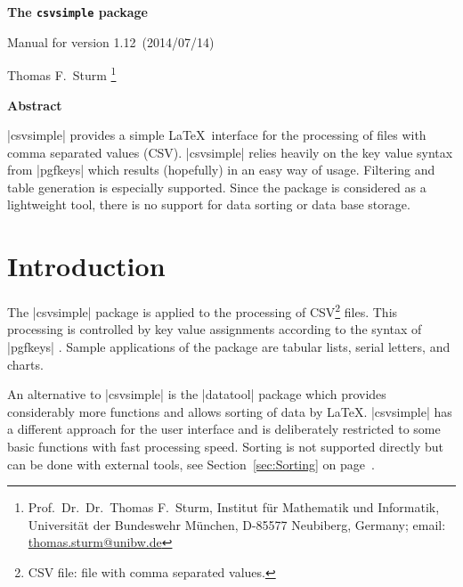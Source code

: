 \documentclass[a4paper,11pt]{ltxdoc}
\def\version{1.12}%
\def\datum{2014/07/14}%
\begin{document}
\begin{center}
\vspace*{5mm}
\begin{tcolorbox}[enhanced,
  center upper,width=10cm,boxrule=0.4pt,
  colback=white,colframe=black!50!yellow,drop fuzzy midday shadow=black!50!yellow]
{\bfseries\LARGE The \texttt{csvsimple} package\par}\medskip
{\large Manual for version \version\ (\datum)\par}
\end{tcolorbox}\bigskip
{\large Thomas F.~Sturm%
  \footnote{Prof.~Dr.~Dr.~Thomas F.~Sturm, Institut f\"{u}r Mathematik und Informatik,
    Universit\"{a}t der Bundeswehr M\"{u}nchen, D-85577 Neubiberg, Germany;
     email: \href{mailto:thomas.sturm@unibw.de}{thomas.sturm@unibw.de}} }
\end{center}
\bigskip
\begin{absquote}
  \begin{center}\bfseries Abstract\end{center}
  |csvsimple| provides a simple \LaTeX\ interface for the processing of files with
  comma separated values (CSV). |csvsimple| relies heavily on the key value
  syntax from |pgfkeys| which results (hopefully) in an easy way of usage.
  Filtering and table generation is especially supported. Since the package
  is considered as a lightweight tool, there is no support for data sorting
  or data base storage.
\end{absquote}

\tableofcontents

\clearpage
\section{Introduction}%
The |csvsimple| package is applied to the processing of
CSV\footnote{CSV file: file with comma separated values.} files.
This processing is controlled by key value assignments according to the
syntax of |pgfkeys| \cite{tantau:2013a}. Sample applications of the package
are tabular lists, serial letters, and charts.

An alternative to |csvsimple| is the |datatool| package \cite{talbot:2014a}
which provides considerably more functions and allows sorting of data by \LaTeX.
|csvsimple| has a different approach for the user interface and
is deliberately restricted to some basic functions with fast
processing speed. Sorting is not supported directly but can be done
with external tools, see Section~\ref{sec:Sorting} on page~\pageref{sec:Sorting}.
\end{document}
